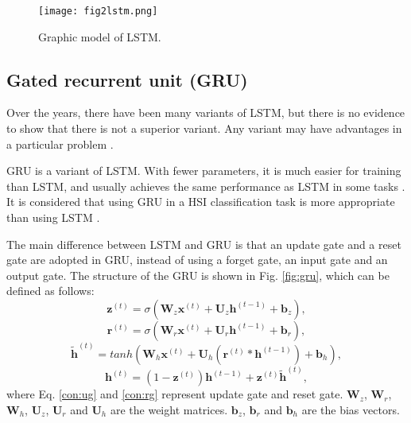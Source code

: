 \documentclass[conference]{IEEEtran}
\begin{document}
\begin{figure}[htbp]
    \centerline{\texttt{[image: fig2lstm.png]}}
    \caption{Graphic model of LSTM.}
    \label{fig:lstm}
\end{figure}

\subsection{Gated recurrent unit (GRU)}

Over the years, there have been many variants of LSTM, but there is no evidence to show
that there is not a superior variant. Any variant may have advantages in a particular
problem \cite{greff2017lstm}.

GRU \cite{yao2015depth} is a variant of LSTM. With fewer parameters, it is much easier
for training than LSTM, and usually achieves the same performance as LSTM in some tasks
\cite{jozefowicz2015empirical}. It is considered that using GRU in a HSI classification
task is more appropriate than using LSTM \cite{mou2017deep}.

The main difference between LSTM and GRU is that an update gate and a reset gate are
adopted in GRU, instead of using a forget gate, an input gate and an output gate. The
structure of the GRU is shown in Fig. \ref{fig:gru}, which can be defined as follows:
\begin{equation}
    \mathbf{z}^{(t)}= \sigma (\mathbf{W}_z\mathbf{x}^{(t)}+\mathbf{U}_z\mathbf{h}^{(t-1)}+\mathbf{b}_z) ,
    \label{con:ug}
\end{equation}
\begin{equation}
    \mathbf{r}^{(t)}= \sigma (\mathbf{W}_r\mathbf{x}^{(t)}+\mathbf{U}_r\mathbf{h}^{(t-1)}+\mathbf{b}_r) ,
    \label{con:rg}
\end{equation}
\begin{equation}
    \tilde{\mathbf{h}}^{(t)}= tanh (\mathbf{W}_h\mathbf{x}^{(t)}+\mathbf{U}_h(\mathbf{r}^{(t)}*\mathbf{h}^{(t-1)})+\mathbf{b}_h) ,
\end{equation}
\begin{equation}
    \mathbf{h}^{(t)}= (1-\mathbf{z}^{(t)})\mathbf{h}^{(t-1)} + \mathbf{z}^{(t)}\tilde{\mathbf{h}}^{(t)},
\end{equation}
where Eq. \eqref{con:ug} and \eqref{con:rg} represent update gate and reset gate.
$\mathbf{W}_z$, $\mathbf{W}_r$, $\mathbf{W}_h$, $\mathbf{U}_z$, $\mathbf{U}_r$ and
$\mathbf{U}_h$ are the weight matrices. $\mathbf{b}_z$, $\mathbf{b}_r$ and
$\mathbf{b}_h$ are the bias vectors.
\end{document}
